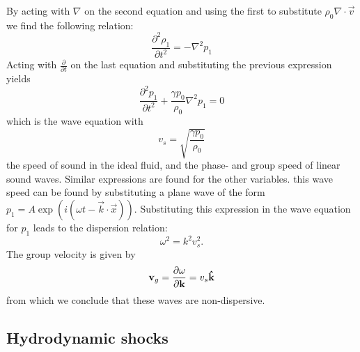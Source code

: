 {\centering 
\noindent {}
\par}
By acting with $\nabla$ on the second equation and using the first to substitute $\rho_0 \nabla \cdot \vec{v}$ we find the following relation:
\begin{equation*}
	\frac{\partial^2 \rho_1}{\partial t^2} = -\nabla^2 p_1
\end{equation*}
Acting with $ \frac{\partial}{\partial t}$ on the last equation and substituting the previous expression yields
\begin{equation*}
	\frac{\partial^2 p_1}{\partial t^2} + \frac{\gamma p_0}{\rho_0} \nabla^2 p_1 = 0
\end{equation*}
which is the wave equation with 
\begin{equation}
v_s = \sqrt{ \frac{\gamma p_0}{\rho_0} }
\label{eq:sound-speed}
\end{equation}
the speed of sound in the ideal fluid, and the phase- and group speed of linear sound waves.
Similar expressions are found for the other variables. 
this wave speed can be found by substituting a plane wave of the form $p_1 = A \exp \left( i(\omega t - \vec{k}\cdot\vec{x}) \right) $. Substituting this expression in the wave equation for $p_1$ leads to the dispersion relation:
\begin{equation}
	\omega^2 = k^2v_s^2.
\end{equation}
The group velocity is given by
\begin{equation}
	\mathbf{v}_{g} = \frac{\partial \omega}{\partial \mathbf{k}} = v_s\mathbf{\hat{k}}
	\label{eq:group-velocity}
\end{equation}
from which we conclude that these waves are non-dispersive.

\subsection{Hydrodynamic shocks}

